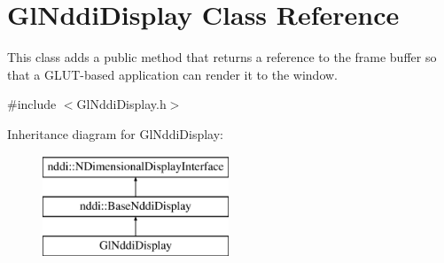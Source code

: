 \hypertarget{class_gl_nddi_display}{
\section{GlNddiDisplay Class Reference}
\label{class_gl_nddi_display}
}


This class adds a public method that returns a reference to the frame buffer so that a GLUT-\/based application can render it to the window.  




{\ttfamily \#include $<$GlNddiDisplay.h$>$}

Inheritance diagram for GlNddiDisplay:\begin{figure}[H]
\begin{center}
\leavevmode
\includegraphics[height=3.000000cm]{class_gl_nddi_display}
\end{center}
\end{figure}

